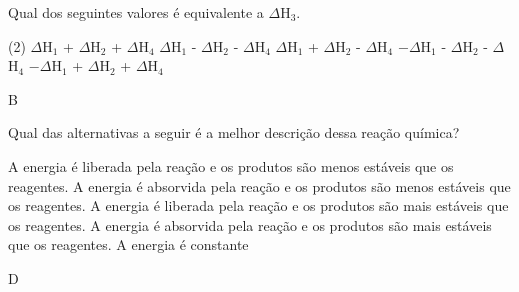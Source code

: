 \documentclass[11pt]{article}
\begin{document}
\begin{exercise}[points=1.0]
Qual dos seguintes valores é equivalente a  $\Delta$H$_3$. 
\begin{center}
\end{center}

\begin{choice}(2)
\choice $\Delta$H$_1$ + $\Delta$H$_2$ + $\Delta$H$_4$
\choice $\Delta$H$_1$ - $\Delta$H$_2$ - $\Delta$H$_4$
\choice $\Delta$H$_1$ + $\Delta$H$_2$ - $\Delta$H$_4$
\choice $- \Delta$H$_1$ - $\Delta$H$_2$ - $\Delta$H$_4$
\choice $- \Delta$H$_1$ + $\Delta$H$_2$ + $\Delta$H$_4$
\end{choice}
\end{exercise}
\begin{solution}
B
\end{solution}



\begin{exercise}[points=1.0]
Qual das alternativas a seguir é a melhor descrição dessa reação química?
\begin{center}
\begin{endiagram}[
x-label=right,
y-label= above, y-label-text = Energia,
x-label= below, x-label-text = Progresso da Reação]
\end{endiagram}
\end{center}
\begin{choice}
\choice A energia é liberada pela reação e os produtos são menos estáveis que os reagentes.
\choice A energia é absorvida pela reação e os produtos são menos estáveis que os reagentes.
\choice A energia é liberada pela reação e os produtos são mais estáveis que os reagentes.
\choice A energia é absorvida pela reação e os produtos são mais estáveis que os reagentes.
\choice A energia é constante 
\end{choice}
\end{exercise}
\begin{solution}
D
\end{solution}
\end{document}
